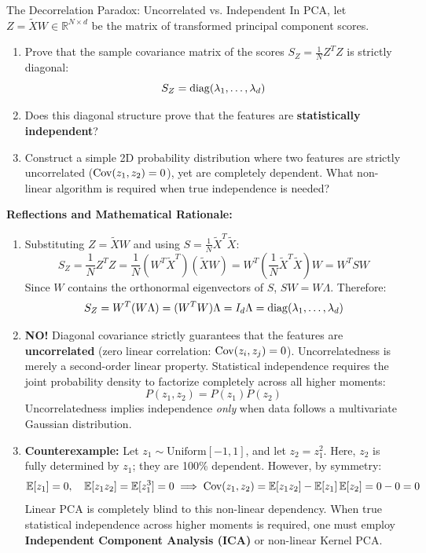 \begin{ponderbox}{The Decorrelation Paradox: Uncorrelated vs. Independent}
In PCA, let $Z = \tilde{X} W \in \mathbb{R}^{N \times d}$ be the matrix of transformed principal component scores.
\begin{enumerate}
    \item Prove that the sample covariance matrix of the scores $S_Z = \frac{1}{N} Z^T Z$ is strictly diagonal:
    \begin{equation*}
    S_Z = \operatorname{diag}(\lambda_1, \dots, \lambda_d)
    \end{equation*}
    \item Does this diagonal structure prove that the features are \textbf{statistically independent}?
    \item Construct a simple 2D probability distribution where two features are strictly uncorrelated ($\operatorname{Cov}(z_1, z_2) = 0$), yet are completely dependent. What non-linear algorithm is required when true independence is needed?
\end{enumerate}
\tcblower
\textbf{Reflections and Mathematical Rationale:}
\begin{enumerate}
    \item Substituting $Z = \tilde{X} W$ and using $S = \frac{1}{N}\tilde{X}^T \tilde{X}$:
    \begin{equation*}
    S_Z = \frac{1}{N} Z^T Z = \frac{1}{N} (W^T \tilde{X}^T) (\tilde{X} W) = W^T \left(\frac{1}{N}\tilde{X}^T \tilde{X}\right) W = W^T S W
    \end{equation*}
    Since $W$ contains the orthonormal eigenvectors of $S$, $S W = W \Lambda$. Therefore:
    \begin{equation*}
    S_Z = W^T (W \Lambda) = (W^T W) \Lambda = I_d \Lambda = \operatorname{diag}(\lambda_1, \dots, \lambda_d)
    \end{equation*}
    \item \textbf{NO!} Diagonal covariance strictly guarantees that the features are \textbf{uncorrelated} (zero linear correlation: $\operatorname{Cov}(z_i, z_j) = 0$). Uncorrelatedness is merely a second-order linear property. Statistical independence requires the joint probability density to factorize completely across all higher moments:
    \begin{equation*}
    P(z_1, z_2) = P(z_1) P(z_2)
    \end{equation*}
    Uncorrelatedness implies independence \emph{only} when data follows a multivariate Gaussian distribution.
    \item \textbf{Counterexample:} Let $z_1 \sim \text{Uniform}[-1, 1]$, and let $z_2 = z_1^2$.
    Here, $z_2$ is fully determined by $z_1$; they are 100\% dependent.
    However, by symmetry:
    \begin{equation*}
    \operatorname{\mathbb{E}}[z_1] = 0, \quad \operatorname{\mathbb{E}}[z_1 z_2] = \operatorname{\mathbb{E}}[z_1^3] = 0 \implies \operatorname{Cov}(z_1, z_2) = \operatorname{\mathbb{E}}[z_1 z_2] - \operatorname{\mathbb{E}}[z_1]\operatorname{\mathbb{E}}[z_2] = 0 - 0 = 0
    \end{equation*}
    Linear PCA is completely blind to this non-linear dependency. When true statistical independence across higher moments is required, one must employ \textbf{Independent Component Analysis (ICA)} or non-linear Kernel PCA.
\end{enumerate}
\end{ponderbox}

